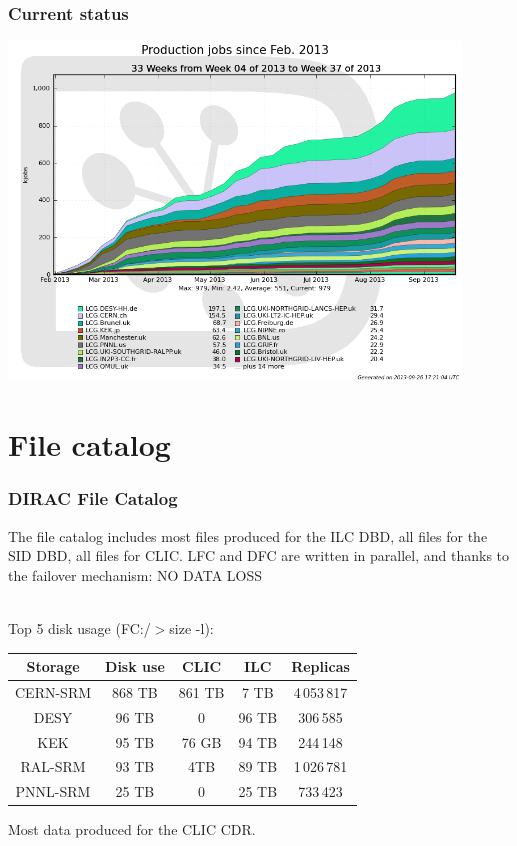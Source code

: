 \documentclass[10pt,table,dvipsnames]{beamer}
\begin{document}
\begin{frame} 
\frametitle{Current status}
\centering
\includegraphics[width=0.9\textwidth]{prodjobs}
\end{frame} 

\section{File catalog}
\begin{frame}
\frametitle{DIRAC File Catalog}
The file catalog includes most files produced for the ILC DBD, all files 
for the SID DBD, all files for CLIC. LFC and DFC are written in parallel, and
thanks to the failover mechanism: \alert{NO DATA LOSS}

~\\

Top 5 disk usage {\scriptsize (FC:/$>$size -l)}:\\
\begin{center}
\begin{tabular}{|ccccc|}
\hline
Storage & Disk use & CLIC & ILC & Replicas \\
\hline
CERN-SRM & 868 TB & 861 TB & 7 TB & 4\,053\,817\\
\hline
DESY & 96 TB & 0 & 96 TB& 306\,585\\
\hline
KEK & 95 TB & 76 GB & 94 TB & 244\,148\\
\hline
RAL-SRM & 93 TB & 4TB & 89 TB & 1\,026\,781\\
\hline
PNNL-SRM & 25 TB & 0 & 25 TB & 733\,423\\
\hline
\end{tabular}
\end{center}
Most data produced for the CLIC CDR.

\end{frame}
\end{document}
